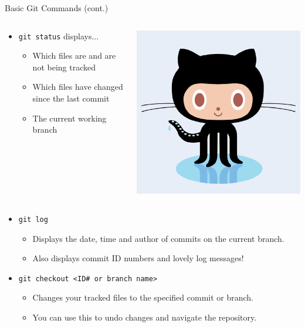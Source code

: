 \documentclass[11pt]{beamer}
\begin{document}
\begin{frame}{Basic Git Commands (cont.)}
\begin{columns}
\begin{column}{0.75\textwidth}
\begin{itemize}
\item \texttt{git status} displays...
\begin{itemize}
\item Which files are and are not being tracked
\item Which files have changed since the last commit
\item The current working branch
\end{itemize}
\end{itemize}
\end{column}
\begin{column}{0.23\textwidth}
\includegraphics[scale=0.15]{octocat.png}
\end{column}
\end{columns}

\begin{itemize}
\item \texttt{git log}
\begin{itemize}
\item Displays the date, time and author of commits on the current branch.
\item Also displays commit ID numbers and lovely log messages! 
\end{itemize}
\item \texttt{git checkout <ID\# or branch name>}
\begin{itemize}
\item Changes your tracked files to the specified commit or branch.
\item You can use this to undo changes and navigate the repository.
\end{itemize}
\end{itemize}
\end{frame}
\end{document}
